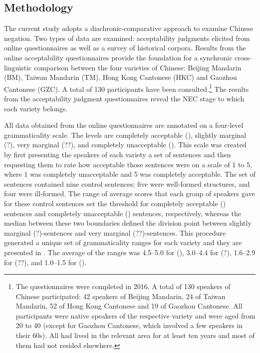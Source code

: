 \documentclass[output=paper,colorlinks,citecolor=brown,chinesefont]{langscibook}
\begin{document}
\subsection{Methodology}\label{s:lam2-2}

The current study adopts a diachronic-comparative approach to examine Chinese negation. Two types of data are examined: acceptability judgments elicited from online questionnaires as well as a survey of historical corpora. Results from the online acceptability questionnaires provide the foundation for a synchronic cross-linguistic comparison between the four varieties of Chinese: Beijing Mandarin (BM), Taiwan Mandarin (TM), Hong Kong Cantonese (HKC) and Gaozhou Cantonese (GZC). A total of 130 participants have been consulted.\footnote{The questionnaires were completed in 2016. A total of 130 speakers of Chinese participated: 42 speakers of Beijing Mandarin, 24 of Taiwan Mandarin, 52 of Hong Kong Cantonese and 19 of Gaozhou Cantonese. All participants were native speakers of the respective variety and were aged from 20 to 40 (except for Gaozhou Cantonese, which involved a few speakers in their 60s). All had lived in the relevant area for at least ten years and most of them had not resided elsewhere.} 
The results from the acceptability judgment questionnaires reveal the NEC stage to which each variety belongs. 

All data obtained from the online questionnaires are annotated on a four-level grammaticality scale. The levels are completely acceptable (), slightly marginal (?), very marginal (??), and completely unacceptable (\ast). 
This scale was created by first presenting the speakers of each variety a set of sentences and then requesting them to rate how acceptable those sentences were on a scale of 1 to 5, where 1 was completely unacceptable and 5 was completely acceptable. The set of sentences contained nine control sentences; five were well-formed structures, and four were ill-formed. The range of average scores that each group of speakers gave for these control sentences set the threshold for completely acceptable () sentences and completely unacceptable (\ast) sentences, respectively, whereas the median between these two boundaries defined the division point between slightly marginal (?)-sentences and very marginal (??)-sentences. This procedure generated a unique set of grammaticality ranges for each variety and they are presented in . The average of the ranges was 4.5--5.0 for (), 3.0--4.4 for (?), 1.6--2.9 for (??), and 1.0--1.5 for (\ast).
\end{document}
